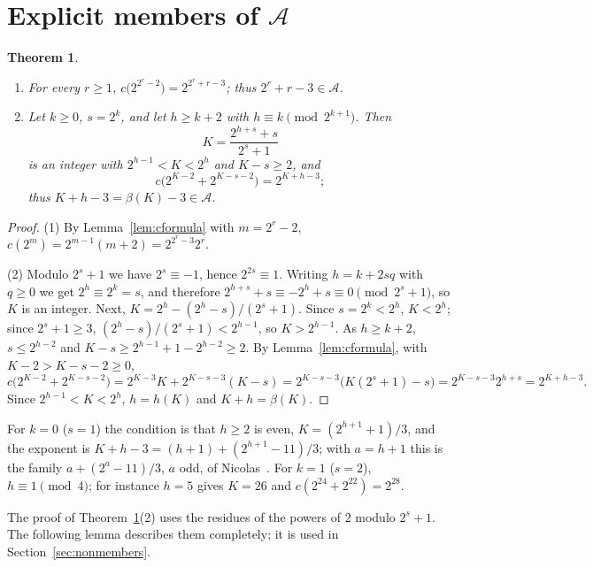 \documentclass[11pt]{amsart}
\newtheorem{Theorem}{Theorem}[section]
\theoremstyle{definition}
\begin{document}
\section{Explicit members of $\mathcal{A}$}
\label{sec:members}
\begin{Theorem}
\label{thm:members}
\begin{enumerate}
\item For every $r\ge1$, $c\bigl(2^{2^r-2}\bigr)=2^{2^r+r-3}$; thus $2^r+r-3\in\mathcal{A}$.
\item Let $k\ge0$, $s=2^k$, and let $h\ge k+2$ with $h\equiv k\pmod{2^{k+1}}$. Then
\begin{equation}
\label{eq:Kmember}
K=\frac{2^{h+s}+s}{2^s+1}
\end{equation}
is an integer with $2^{h-1}<K<2^h$ and $K-s\ge2$, and
\begin{equation}
\label{eq:member}
c\bigl(2^{K-2}+2^{K-s-2}\bigr)=2^{K+h-3};
\end{equation}
thus $K+h-3=\beta(K)-3\in\mathcal{A}$.
\end{enumerate}
\end{Theorem}
\begin{proof}
(1) By Lemma~\ref{lem:cformula} with $m=2^r-2$, $c(2^m)=2^{m-1}(m+2)=2^{2^r-3}2^r$.

(2) Modulo $2^s+1$ we have $2^s\equiv-1$, hence $2^{2s}\equiv1$. Writing $h=k+2sq$ with $q\ge0$ we get $2^h\equiv2^k=s$, and therefore $2^{h+s}+s\equiv-2^h+s\equiv0\pmod{2^s+1}$, so $K$ is an integer. Next, $K=2^h-(2^h-s)/(2^s+1)$. Since $s=2^k<2^h$, $K<2^h$; since $2^s+1\ge3$, $(2^h-s)/(2^s+1)<2^{h-1}$, so $K>2^{h-1}$. As $h\ge k+2$, $s\le2^{h-2}$ and $K-s\ge2^{h-1}+1-2^{h-2}\ge2$. By Lemma~\ref{lem:cformula}, with $K-2>K-s-2\ge0$,
\[
c\bigl(2^{K-2}+2^{K-s-2}\bigr)=2^{K-3}K+2^{K-s-3}(K-s)=2^{K-s-3}\bigl(K(2^s+1)-s\bigr)=2^{K-s-3}2^{h+s}=2^{K+h-3}.
\]
Since $2^{h-1}<K<2^h$, $h=h(K)$ and $K+h=\beta(K)$.
\end{proof}

For $k=0$ ($s=1$) the condition is that $h\ge2$ is even, $K=(2^{h+1}+1)/3$, and the exponent is $K+h-3=(h+1)+(2^{h+1}-11)/3$; with $a=h+1$ this is the family $a+(2^a-11)/3$, $a$ odd, of Nicolas~\cite{nicolas2005open}. For $k=1$ ($s=2$), $h\equiv1\pmod4$; for instance $h=5$ gives $K=26$ and $c(2^{24}+2^{22})=2^{28}$.

The proof of Theorem~\ref{thm:members}(2) uses the residues of the powers of $2$ modulo $2^s+1$. The following lemma describes them completely; it is used in Section~\ref{sec:nonmembers}.
\end{document}
